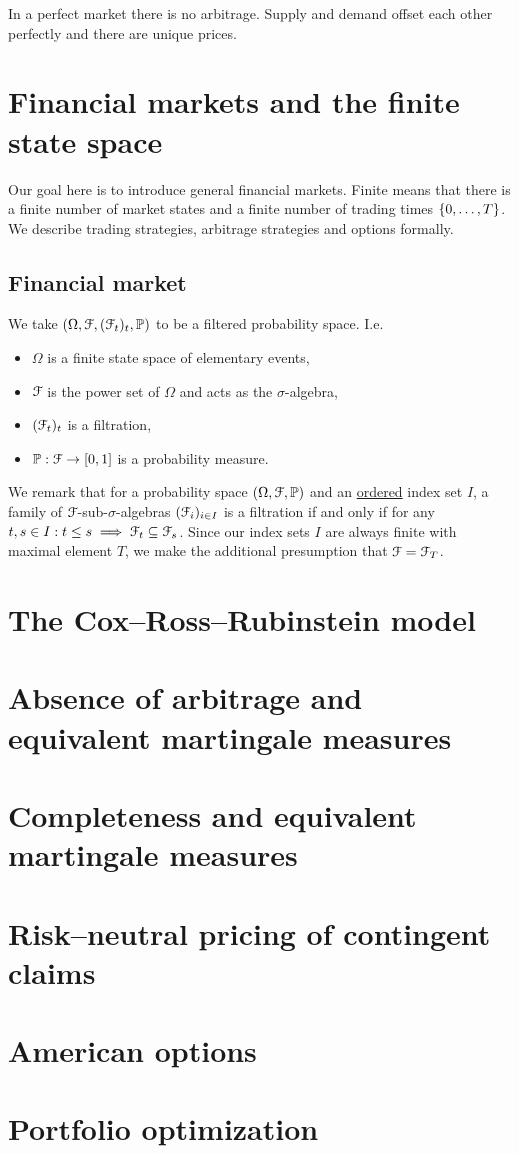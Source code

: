 \documentclass[12pt]{amsart}
\begin{document}
In a perfect market there is no arbitrage. Supply and demand offset each other perfectly and there are unique prices.

\section{Financial markets and the finite state space}

Our goal here is to introduce general financial markets. Finite means that there is a finite number of market states and a finite number of trading times \(\left\{ 0, \dots, T \right\}\). We describe trading strategies, arbitrage strategies and options formally.

\subsection{Financial market}

We take \((\Omega, \mathcal{F}, (\mathcal{F}_t)_{t}, \mathbb{P})\) to be a filtered probability space. I.e.\
\begin{itemize}
    \item \(\Omega\) is a finite state space of elementary events,
    \item \(\mathcal{F}\) is the power set of \(\Omega\) and acts as the \(\sigma\)-algebra,
    \item \((\mathcal{F}_t)_t\) is a filtration,
    \item \(\mathbb{P}: \mathcal{F} \to [0, 1]\) is a probability measure.
\end{itemize}

\begin{remark}
    We remark that for a probability space \((\Omega, \mathcal{F}, \mathbb{P})\) and an \underline{ordered} index set \(I\), a family of \(\mathcal{F}\)-sub-\(\sigma\)-algebras \((\mathcal{F}_i)_{i \in I}\) is a filtration if and only if for any \(t, s \in I: t \leq s \implies \mathcal{F}_t \subseteq \mathcal{F}_s\). Since our index sets \(I\) are always finite with maximal element \(T\), we make the additional presumption that \(\mathcal{F} = \mathcal{F}_T\).
\end{remark}

\section{The Cox--Ross--Rubinstein model}
\section{Absence of arbitrage and equivalent martingale measures}
\section{Completeness and equivalent martingale measures}
\section{Risk--neutral pricing of contingent claims}
\section{American options}
\section{Portfolio optimization}
\end{document}
